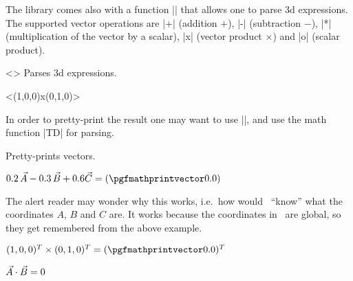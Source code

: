 \documentclass[a4paper]{ltxdoc}
\begin{document}
The library comes also with a function |\pgfmathtdparse| that allows one to parse 3d
expressions. The supported vector operations are |+| (addition $+$), |-|
(subtraction $-$), |*| (multiplication of the vector by a scalar), |x|
(vector product $\times$) and |o| (scalar product).

\begin{command}{\pgfmathtdparse<>}
   Parses 3d expressions.
\end{command}


\begin{codeexample}[]
\pgfmathtdparse<({1,0,0})x({0,1,0})>\pgfmathresult
\end{codeexample}

In order to pretty-print the result one may want to use |\pgfmathprintvector|,
and use the math function |TD| for parsing.

\begin{command}{\pgfmathprintvector{}}
   Pretty-prints vectors.
\end{command}

\begin{codeexample}[width=6.5cm]
%
$0.2\,\vec A-0.3\,\vec B+0.6\vec C
=(\pgfmathprintvector\pgfmathresult)$
\end{codeexample}

The alert reader may wonder why this works, i.e.\ how would \tikzname\ ``know''
what the coordinates $A$, $B$ and $C$ are. It works because the coordinates in
\tikzname\ are global, so they get remembered from the above example.

\begin{codeexample}[width=5.2cm]
%
$(1,0,0)^T\times(0,1,0)^T=
(\pgfmathprintvector\pgfmathresult)^T$
\end{codeexample}


\begin{codeexample}[width=5.2cm]
%
$\vec A\cdot \vec B=
\pgfmathprintnumber\pgfmathresult$
\end{codeexample}
\end{document}
